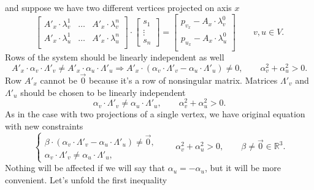 and suppose we have two different vertices projected on axis $x$
\begin{equation*}
  \begin{bmatrix}
    A'_x \cdot \lambda^1_v & \dots & A'_x \cdot \lambda^n_v \\
    A'_x \cdot \lambda^1_u & \dots & A'_x \cdot \lambda^n_u \\
  \end{bmatrix}
  \cdot \begin{bmatrix}
    s_1 \\
    \vdots \\
    s_n
  \end{bmatrix}
  = \begin{bmatrix}
    p_{v_x} - A_x \cdot \lambda^0_v \\
    p_{u_x} - A_x \cdot \lambda^0_u \\
  \end{bmatrix}
  \qquad v, u \in V.
\end{equation*}
Rows of the system should be linearly independent as well
\begin{equation*}
  A'_x \cdot \alpha_v \cdot \Lambda'_v \neq A'_x \cdot \alpha_u \cdot \Lambda'_u
  \Rightarrow
  A'_x \cdot \left( \alpha_v \cdot \Lambda'_v
                  - \alpha_u \cdot \Lambda'_u \right)
    \neq 0,
  \qquad \alpha_v^2 + \alpha_u^2 > 0.
\end{equation*}
Row $A'_x$ cannot be $\vec{0}$ because it's a row of nonsingular matrix.
Matrices $\Lambda'_v$ and $\Lambda'_u$
should be chosen to be linearly independent
\begin{equation*}
  \alpha_v \cdot \Lambda'_v \neq \alpha_u \cdot \Lambda'_u,
  \qquad \alpha_v^2 + \alpha_u^2 > 0.
\end{equation*}
As in the case with two projections of a single vertex,
we have original equation with new constraints
\begin{equation*}
  \begin{cases}
    \beta \cdot \left( \alpha_v \cdot \Lambda'_v
                     - \alpha_u \cdot \Lambda'_u \right)
    \neq \vec{0}, \\
    \alpha_v \cdot \Lambda'_v \neq \alpha_u \cdot \Lambda'_u,
  \end{cases}
  \qquad \alpha_v^2 + \alpha_u^2 > 0,
  \qquad \beta \neq \vec{0} \in \mathbb{R}^3.
\end{equation*}
Nothing will be affected if we will say that $\alpha_u = - \alpha_u$,
but it will be more convenient.
Let's unfold the first inequality

